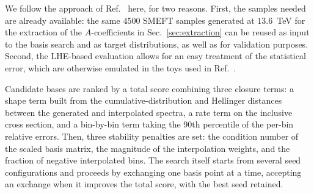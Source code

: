 We follow the approach of Ref.~\cite{HH_nonggf_R5} here, for two reasons. First, the samples needed are already available: the same $4500$ SMEFT samples generated at $13.6$~TeV for the extraction of the $A$-coefficients in Sec.~\ref{sec:extraction} can be reused as input to the basis search and as target distributions, as well as for validation purposes. Second, the LHE-based evaluation allows for an easy treatment of the statistical error, which are otherwise emulated in the toys used in Ref.~\cite{HHMatrix_R5}.





Candidate bases are ranked by a total score combining three closure terms: a shape term built from the cumulative-distribution and Hellinger distances between the generated and interpolated spectra, a rate term on the inclusive cross section, and a bin-by-bin term taking the 90th percentile of the per-bin relative errors. Then, three stability penalties are set: the condition number of the scaled basis matrix, the magnitude of the interpolation weights, and the fraction of negative interpolated bins. The search itself starts from several seed configurations and proceeds by exchanging one basis point at a time, accepting an exchange when it improves the total score, with the best seed retained.


